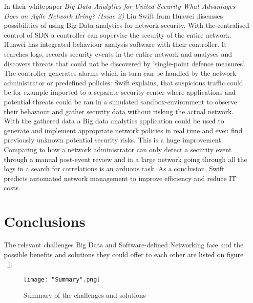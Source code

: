 \documentclass{acm_proc_article-sp}
\begin{document}
In their whitepaper \textit{Big Data Analytics for United Security \textendash What Advantages Does an Agile Network Bring? (Issue 2)} \cite{Liu2014} Liu Swift from Huawei discusses possibilities of using Big Data analytics for network security. With the centralised control of SDN a controller can supervise the security of the entire network. Huawei has integrated behaviour analysis software with their controller. It searches logs, records security events in the entire network and analyses and discovers threats that could not be discovered by 'single-point defence measures'. The controller generates alarms which in turn can be handled by the network administrator or predefined policies: Swift explains, that suspicious traffic could be for example imported to a separate security center where applications and potential threats could be ran in a simulated sandbox-environment to observe their behaviour and gather security data without risking the actual network. With the gathered data a Big data analytics application could be used to generate and implement appropriate network policies in real time and even find previously unknown potential security risks. This is a huge improvement. Comparing to how a network administrator can only detect a security event through a manual post-event review and in a large network going through all the logs in a search for correlations is an arduous task. As a conclusion, Swift predicts automated network management to improve efficiency and reduce IT costs. 

\section{Conclusions}

The relevant challenges Big Data and Software-defined Networking face and the possible benefits and solutions they could offer to each other are listed on figure ~\ref{fig:summary}.

\begin{figure}[ht]
\centering
{}
\texttt{[image: "Summary".png]}
\caption{Summary of the challenges and solutions}
\label{fig:summary}
\end{figure} 
\end{document}
